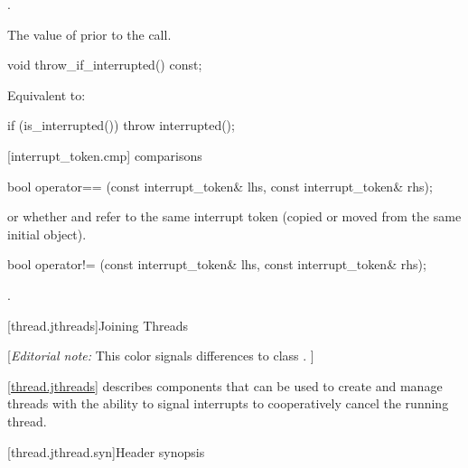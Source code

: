 {\begin{itemdescr}
  \pnum\effects {}.

  \pnum\returns The value of  prior to the call.
\end{itemdescr}

%
\begin{itemdecl}
void throw_if_interrupted() const;
\end{itemdecl}
\begin{itemdescr}
  \pnum\effects Equivalent to:
\begin{codeblock}
if (is_interrupted())
  throw interrupted();
\end{codeblock}
\end{itemdescr}


[interrupt_token.cmp]{ comparisons}

%
\begin{itemdecl}
bool operator== (const interrupt_token& lhs, const interrupt_token& rhs);
\end{itemdecl}
\begin{itemdescr}
  \pnum\returns {} or
                whether  and  refer to the
                same interrupt token
                (copied or moved from the same initial object).
\end{itemdescr}

%
\begin{itemdecl}
bool operator!= (const interrupt_token& lhs, const interrupt_token& rhs);
\end{itemdecl}
\begin{itemdescr}
  \pnum\returns {}.
\end{itemdescr}


\clearpage

[thread.jthreads]{Joining Threads}

{\color{blue}
[{\itshape{}Editorial note:} {\color{diffcolor}This color signals differences to class .} ]
}


\pnum
\ref{thread.jthreads} describes components that can be used to create and manage threads
with the ability to signal interrupts to cooperatively cancel the running thread.

[thread.jthread.syn]{Header  synopsis}
%

}
